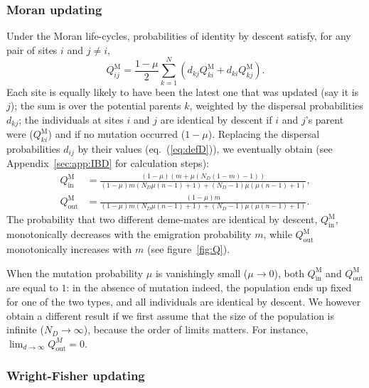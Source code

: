 \documentclass[11pt, letterpaper]{article}
\renewcommand{\eqref}[1]{\textup{{\normalfont eq.~(\ref{#1}}\normalfont)}}
\newcommand{\appname}[0]{Appendix}
\newcommand{\Moran}{\textrm{M}}
\newcommand{\Qin}{Q_{\textrm{in}}}
\newcommand{\Qout}{Q_{\textrm{out}}}
\newcommand{\ndemes}{N_D}
\begin{document}
\subsubsection{Moran updating} 

Under the Moran life-cycles, probabilities of identity by descent satisfy, for any pair of sites $i$ and $j\neq i$,
\begin{equation}
Q_{ij}^{\Moran} = \frac{1-\mu}{2} \sum_{k=1}^N \left(d_{kj} Q_{ki}^{\Moran} + d_{ki} Q_{kj}^{\Moran}\right).
\end{equation}
Each site is equally likely to have been the latest one that was updated (say it is $j$); the sum is over the potential parents $k$, weighted by the dispersal probabilities $d_{kj}$; the individuals at sites $i$ and $j$ are identical by descent if $i$ and $j$'s parent were ($Q_{ki}^{\Moran}$) and if no mutation occurred ($1-\mu$). Replacing the dispersal probabilities $d_{ij}$ by their values (\eqref{eq:defD}), we eventually obtain (see \appname~\ref{sec:app:IBD} for calculation steps):
\begin{subequations}\label{eq:QM}
\begin{align}
\Qin^{\Moran} &= \frac{(1-\mu ) \left(m + \mu  (\ndemes (1-m)-1)\right)}{(1-\mu ) m (\ndemes \mu  (n-1)+1)+(\ndemes-1) \mu  (\mu  (n-1)+1)},\\
%
%
\Qout^{\Moran} & = \frac{(1-\mu ) m}{(1-\mu ) m (\ndemes \mu  (n-1)+1)+(\ndemes-1) \mu  (\mu  (n-1)+1)}.
\end{align}
\end{subequations}
%
The probability that two different deme-mates are identical by descent, $\Qin^{\Moran}$, monotonically decreases with the emigration probability $m$, while  $\Qout^{\Moran}$ monotonically increases with $m$ (see figure~\ref{fig:Q}). 

When the mutation probability $\mu$ is vanishingly small ($\mu \to 0$), both $\Qin^{\Moran}$ and $\Qout^{\Moran}$ are equal to $1$: in the absence of mutation indeed, the population ends up fixed for one of the two types, and all individuals are identical by descent. We however obtain a different result if we first assume that the size of the population is infinite ($\ndemes \to \infty$), because the order of limits matters. %
For instance, $\lim_{d\to \infty} \Qout^{M}=0$. 


\subsubsection{Wright-Fisher updating}
\end{document}
